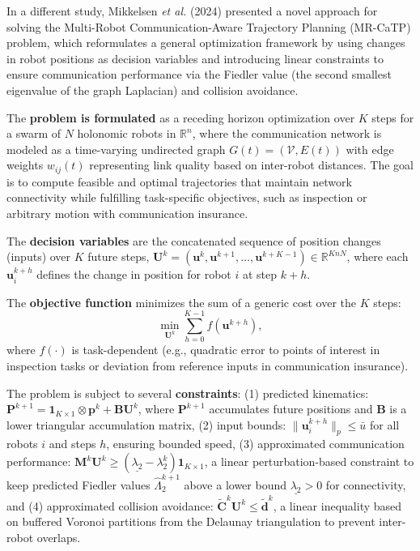 In a different study, Mikkelsen \textit{et al.} (2024) \cite{mikkelsen_2024_optimal} presented a novel approach for solving the Multi-Robot Communication-Aware Trajectory Planning (MR-CaTP) problem, which reformulates a general optimization framework by using changes in robot positions as decision variables and introducing linear constraints to ensure communication performance via the Fiedler value (the second smallest eigenvalue of the graph Laplacian) and collision avoidance.

The \textbf{problem is formulated} as a receding horizon optimization over \(K\) steps for a swarm of \(N\) holonomic robots in \(\mathbb{R}^n\), where the communication network is modeled as a time-varying undirected graph \(G(t) = (\mathcal{V}, E(t))\) with edge weights \(w_{ij}(t)\) representing link quality based on inter-robot distances. The goal is to compute feasible and optimal trajectories that maintain network connectivity while fulfilling task-specific objectives, such as inspection or arbitrary motion with communication insurance.

The \textbf{decision variables} are the concatenated sequence of position changes (inputs) over \(K\) future steps, \(\mathbf{U}^k = (\mathbf{u}^k, \mathbf{u}^{k+1}, \dots, \mathbf{u}^{k+K-1}) \in \mathbb{R}^{KnN}\), where each \(\mathbf{u}^{k+h}_i\) defines the change in position for robot \(i\) at step \(k+h\).

The \textbf{objective function} minimizes the sum of a generic cost over the \(K\) steps:
\begin{equation}
\min_{\mathbf{U}^k} \sum_{h=0}^{K-1} f(\mathbf{u}^{k+h}),
\end{equation}
where \(f(\cdot)\) is task-dependent (e.g., quadratic error to points of interest in inspection tasks or deviation from reference inputs in communication insurance).

The problem is subject to several \textbf{constraints}: 
(1) predicted kinematics: \(\mathbf{P}^{k+1} = \mathbf{1}_{K \times 1} \otimes \mathbf{p}^k + \mathbf{B} \mathbf{U}^k\), where \(\mathbf{P}^{k+1}\) accumulates future positions and \(\mathbf{B}\) is a lower triangular accumulation matrix, 
(2) input bounds: \(\|\mathbf{u}^{k+h}_i\|_p \leq \bar{u}\) for all robots \(i\) and steps \(h\), ensuring bounded speed, 
(3) approximated communication performance: \(\mathbf{M}^k \mathbf{U}^k \geq (\underline{\lambda_2} - \lambda_2^k) \mathbf{1}_{K \times 1}\), a linear perturbation-based constraint to keep predicted Fiedler values \(\hat{\Lambda}^{k+1}_2\) above a lower bound \(\underline{\lambda_2} > 0\) for connectivity, and 
(4) approximated collision avoidance: \(\tilde{\mathbf{C}}^k \mathbf{U}^k \leq \tilde{\mathbf{d}}^k\), a linear inequality based on buffered Voronoi partitions from the Delaunay triangulation to prevent inter-robot overlaps.

